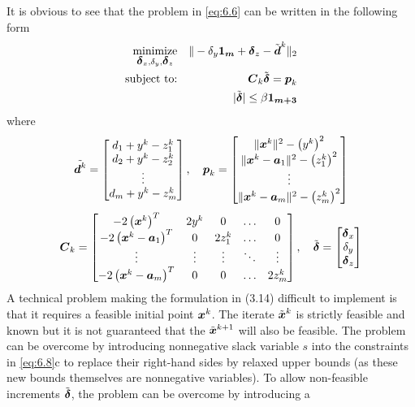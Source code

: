 It is obvious to see that the  problem in \ref{eq:6.6} can be written in the following form
\begin{eqnarray} \label{eq:6.7}
\mathop{\mbox{minimize}}_{{\mbox{\boldmath${\delta}$}_x, \delta_y, \mbox{\boldmath${\delta}$}_z}}& &\| -\delta_y\mbox{\boldmath${1_m}$} + \mbox{\boldmath${\delta}$}_z - \tilde{\mbox{\boldmath$d$}}^k \|_2 
\\ \nonumber
\mbox{subject to:}& &\mbox{\boldmath$C$}_k\tilde{\mbox{\boldmath${\delta}$}}  = \mbox{\boldmath$p$}_k \\
\nonumber
 & &|\tilde{\mbox{\boldmath${\delta}$}}|  \leq \beta \mbox{\boldmath${1_{m+3}}$}
\end{eqnarray}
where
\begin{equation} \label{eq:6.8}
\tilde{\mbox{\boldmath$d$}^k} = 
\begin{bmatrix}
d_1 + y^k - z_1^k \\
d_2 + y^k - z_2^k \\
\vdots \\
d_m + y^k - z_m^k \\
\end{bmatrix}, 
\quad \mbox{\boldmath$p$}_k = \begin{bmatrix}
\|\mbox{\boldmath$x$}^k\|^2 -\left(y^k\right)^2  \\
\|\mbox{\boldmath$x$}^k - \mbox{\boldmath$a$}_1\|^2 -\left(z_1^k\right)^2 \\
\vdots \\
\|\mbox{\boldmath$x$}^k - \mbox{\boldmath$a$}_m\|^2 -\left(z_m^k\right)^2 \\
\end{bmatrix}
\end{equation}
\begin{equation}
\nonumber
\mbox{\boldmath$C$}_k = \begin{bmatrix}
-2\left(\mbox{\boldmath$x$}^k\right)^T & 2y^k & 0 & \hdots & 0 \\
-2\left(\mbox{\boldmath$x$}^k - \mbox{\boldmath$a$}_1\right)^T & 0 & 2z^k_1 & \hdots & 0 \\
\vdots & \vdots & \vdots & \ddots & \vdots \\
-2\left(\mbox{\boldmath$x$}^k - \mbox{\boldmath$a$}_m\right)^T & 0 & 0 & \hdots & 2z_m^k
\end{bmatrix},
\quad \tilde{\mbox{\boldmath${\delta}$}} = \begin{bmatrix}
\mbox{\boldmath${\delta}$}_x \\
\delta_y \\
\mbox{\boldmath${\delta}$}_z
\end{bmatrix}
\end{equation}
A technical problem making the formulation in (3.14) difficult to implement is that it requires a feasible initial point $\mbox{\boldmath$x$}^k$. The iterate $\tilde{\mbox{\boldmath$x$}}^k$ is strictly feasible and known but it is not guaranteed that the $\tilde{\mbox{\boldmath$x$}}^{k+1}$ will also be feasible. The problem can be overcome by introducing nonnegative slack variable $s$ into the constraints in \ref{eq:6.8}c to replace their right-hand sides by relaxed upper bounds (as these new bounds themselves are nonnegative variables). To allow non-feasible increments $\tilde{\mbox{\boldmath${\delta}$}}$, the problem can be overcome by introducing a
